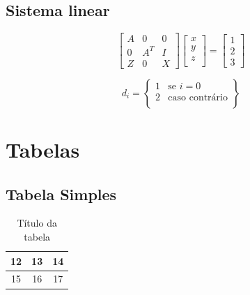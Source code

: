 \documentclass[12pt,fleqn]{article}
\begin{document}
\subsection{Sistema linear}

\begin{equation}
 \left[
\begin{array}{ccc}
 A & 0   & 0 \\
 0 & A^T & I\\
 Z & 0   & X
\end{array} \right]
\left[
\begin{array}{c}
 x \\
 y \\
 z \\
\end{array}
\right]
=
\left[
\begin{array}{c}
 1 \\
 2 \\
 3
\end{array}
\right]
\label{eqpc0}
\end{equation}

\[
d_i=\left \{
\begin{array}{cc}
1 & \mbox{se } i=0 \\
2 & \mbox{caso contrário}\\
\end{array}
\right \}
\]

\clearpage

\section{Tabelas}
\label{sec:tab}


\subsection{Tabela Simples}
\begin{table}[htb]
\begin{center}
		\begin{tabular}{|c|c|c|}\hline
		12  & 13 & 14 \\\hline
		15  & 16 & 17 \\\hline
		\end{tabular}
\label{tab:Tabela1}
\caption{Título da tabela}
\end{center}
\end{table}
\end{document}
